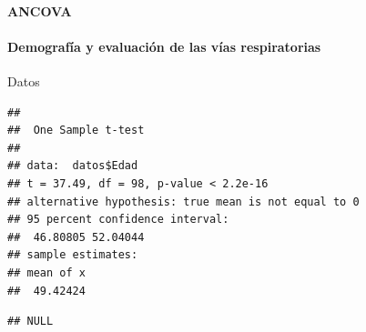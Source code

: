 \documentclass[
]{article}
\newenvironment{Shaded}{\begin{snugshade}}{\end{snugshade}}
\newcommand{\AttributeTok}[1]{\textcolor[rgb]{0.13,0.29,0.53}{#1}}
\newcommand{\CommentTok}[1]{\textcolor[rgb]{0.56,0.35,0.01}{\textit{#1}}}
\newcommand{\FloatTok}[1]{\textcolor[rgb]{0.00,0.00,0.81}{#1}}
\newcommand{\FunctionTok}[1]{\textcolor[rgb]{0.13,0.29,0.53}{\textbf{#1}}}
\newcommand{\NormalTok}[1]{#1}
\newcommand{\OtherTok}[1]{\textcolor[rgb]{0.56,0.35,0.01}{#1}}
\newcommand{\SpecialCharTok}[1]{\textcolor[rgb]{0.81,0.36,0.00}{\textbf{#1}}}
\begin{document}
\hypertarget{ancova}{%
\paragraph{ANCOVA}\label{ancova}}

\begin{Shaded}
\end{Shaded}

\hypertarget{demografuxeda-y-evaluaciuxf3n-de-las-vuxedas-respiratorias}{%
\paragraph{Demografía y evaluación de las vías
respiratorias}\label{demografuxeda-y-evaluaciuxf3n-de-las-vuxedas-respiratorias}}

Datos

\begin{Shaded}
\end{Shaded}

\begin{verbatim}
## 
##  One Sample t-test
## 
## data:  datos$Edad
## t = 37.49, df = 98, p-value < 2.2e-16
## alternative hypothesis: true mean is not equal to 0
## 95 percent confidence interval:
##  46.80805 52.04044
## sample estimates:
## mean of x 
##  49.42424
\end{verbatim}

\begin{Shaded}
\end{Shaded}

\begin{verbatim}
## NULL
\end{verbatim}
\end{document}
